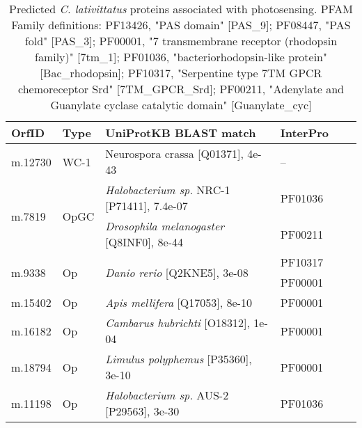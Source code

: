 \begin{table}[htbp]
\caption[\textit{C. lativittatus} photosensing proteins]{Predicted \textit{C. lativittatus} proteins associated with photosensing. PFAM Family definitions: PF13426, "PAS domain" [PAS\_9]; PF08447, "PAS fold" [PAS\_3]; PF00001, "7 transmembrane receptor (rhodopsin family)" [7tm\_1]; PF01036, "bacteriorhodopsin-like protein" [Bac\_rhodopsin]; PF10317, "Serpentine type 7TM GPCR chemoreceptor Srd" [7TM\_GPCR\_Srd]; PF00211, "Adenylate and Guanylate cyclase catalytic domain" [Guanylate\_cyc]} 
\label{tab:ChClat_photosensing}
\begin{tabular}{lllllr}
  \hline
OrfID & Type & UniProtKB BLAST match & InterPro \\ 
  \hline
m.12730 & WC-1 & Neurospora crassa [Q01371], 4e-43 & -- \\ 
  \multirow{2}{*}{m.7819} & \multirow{2}{*}{OpGC} & \emph{Halobacterium sp.} NRC-1 [P71411], 7.4e-07 & PF01036 \\
  & & \emph{Drosophila melanogaster} [Q8INF0], 8e-44 & PF00211 \\ 
  \multirow{2}{*}{m.9338} & \multirow{2}{*}{Op} & \multirow{2}{*}{\emph{Danio rerio} [Q2KNE5], 3e-08} & PF10317 \\
  & & & PF00001 \\
  m.15402 & Op & \emph{Apis mellifera} [Q17053], 8e-10 & PF00001 \\
  m.16182 & Op & \emph{Cambarus hubrichti} [O18312], 1e-04 & PF00001 \\
  m.18794 & Op & \emph{Limulus polyphemus} [P35360], 3e-10 & PF00001 \\
  m.11198 & Op & \emph{Halobacterium sp.} AUS-2 [P29563], 3e-30 & PF01036 \\
   \hline
\end{tabular}
\end{table}
